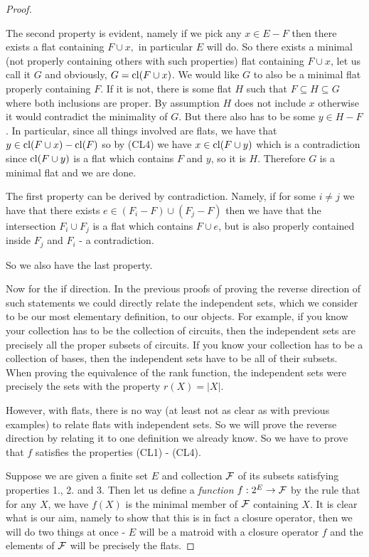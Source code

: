 \begin{proof}
\begin{enumerate}
    The second property is evident, namely if we pick any $x \in E - F$ then there exists a flat containing $F \cup x, $ in particular $E$ will do. So there exists a minimal (not properly containing others with such properties) flat containing $F \cup x$, let us call it $G$ and obviously, $G = \mathrm{cl}(F \cup x)$. We would like $G$ to also be a minimal flat properly containing $F$. If it is not, there is some flat $H$ such that $F \subseteq H \subseteq G$ where both inclusions are proper. By assumption $H$ does not include $x$ otherwise it would contradict the minimality of $G.$ But there also has to be some $y \in H - F$. In particular, since all things involved are flats, we have that $y \in \mathrm{cl}(F \cup x) - \mathrm{cl}(F)$ so by (CL4) we have $x \in \mathrm{cl}(F \cup y)$ which is a contradiction since $\mathrm{cl}(F \cup y)$ is a flat which contains $F$ and $y$, so it is $H.$  Therefore $G$ is a minimal flat and we are done.

    The first property can be derived by contradiction. Namely, if for some $i\neq j$ we have that there exists $e \in (F_i - F)\cup(F_j - F)$ then we have that the intersection $F_i \cup F_j$ is a flat which contains $F\cup e$, but is also properly contained inside $F_j$ and $F_i$ - a contradiction.

    So we also have the last property.
    
\end{enumerate}
    Now for the if direction. In the previous proofs of proving the reverse direction of such statements we could directly relate the independent sets, which we consider to be our most elementary definition, to our objects. For example, if you know your collection has to be the collection of circuits, then the independent sets are precisely all the proper subsets of circuits. If you know your collection has to be a collection of bases, then the independent sets have to be all of their subsets. When proving the equivalence of the rank function, the independent sets were precisely the sets with the property $r(X) = |X|$. 

    However, with flats, there is no way (at least not as clear as with previous examples) to relate flats with independent sets. So we will prove the reverse direction by relating it to one definition we already know. So we have to prove that $f$ satisfies the properties (CL1) - (CL4).

    Suppose we are given a finite set $E$ and collection $\mathcal{F}$ of its subsets satisfying properties 1., 2. and 3. Then let us define a \textit{function} $f: 2^E \to \mathcal{F}$ by the rule that for any $X$, we have $f(X)$ is the minimal member of $\mathcal{F}$ containing $X$. It is clear what is our aim, namely to show that this is in fact a closure operator, then we will do two things at once - $E$ will be a matroid with a closure operator $f$ and the elements of $\mathcal{F}$ will be precisely the flats.


\end{proof}
